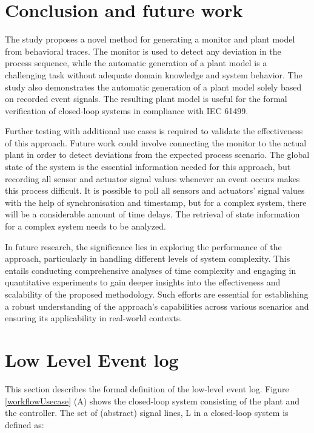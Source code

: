 \documentclass{ieeeojies}
\begin{document}
\section{Conclusion and future work}
\label{cf}


The study proposes a novel method for generating a monitor and plant model from behavioral traces. The monitor is used to detect any deviation in the process sequence, while the automatic generation of a plant model is a challenging task without adequate domain knowledge and system behavior. The study also demonstrates the automatic generation of a plant model solely based on recorded event signals. The resulting plant model is useful for the formal verification of closed-loop systems in compliance with IEC 61499.

Further testing with additional use cases is required to validate the effectiveness of this approach. Future work could involve connecting the monitor to the actual plant in order to detect deviations from the expected process scenario. The global state of the system is the essential information needed for this approach, but recording all sensor and actuator signal values whenever an event occurs makes this process difficult. It is possible to poll all sensors and actuators' signal values with the help of synchronisation and timestamp, but for a complex system, there will be a considerable amount of time delays. The retrieval of state information for a complex system needs to be analyzed. 

In future research, the significance lies in exploring the performance of the approach, particularly in handling different levels of system complexity. This entails conducting comprehensive analyses of time complexity and engaging in quantitative experiments to gain deeper insights into the effectiveness and scalability of the proposed methodology. Such efforts are essential for establishing a robust understanding of the approach's capabilities across various scenarios and ensuring its applicability in real-world contexts.

\appendices
\section{Low Level Event log}
\label{llel}

This section describes the formal definition of the low-level event log. 
Figure \ref{workflowUsecase} (A) shows the closed-loop system consisting of the plant and the controller. The set of (abstract) signal lines, L in a closed-loop system is defined as:
\end{document}
